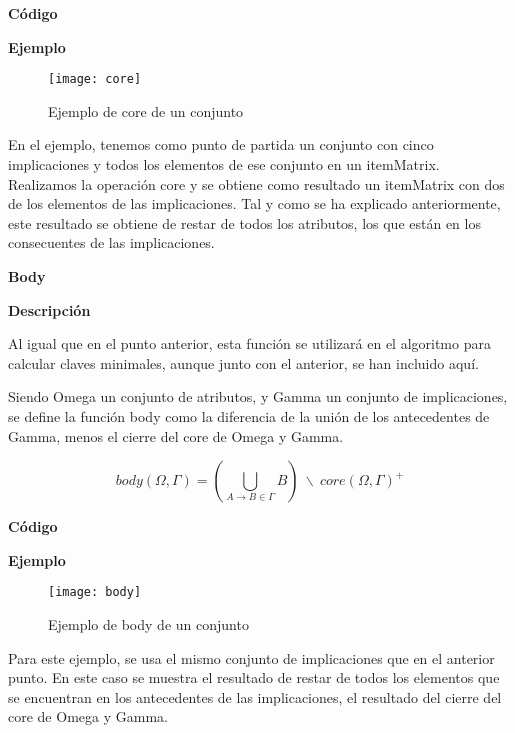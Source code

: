     \bigskip


    \textbf{C\'odigo}

    
    \clearpage

    \textbf{Ejemplo}


    \begin{figure}[H]
        \centering
        \texttt{[image: core]}
        \caption{Ejemplo de core de un conjunto}
        \label{fig:core}
    \end{figure}

    En el ejemplo, tenemos como punto de partida un conjunto con cinco implicaciones y todos los elementos de ese conjunto en 
    un itemMatrix. Realizamos la operaci\'on core y se obtiene como resultado un itemMatrix con dos de los elementos de las implicaciones. 
    Tal y como se ha explicado anteriormente, este resultado se obtiene de restar de todos los atributos, los que est\'an en los consecuentes 
    de las implicaciones.
    \\

    \bigskip

\textbf{ \large Body}

\smallskip

    \textbf{Descripci\'on}

    Al igual que en el punto anterior, esta funci\'on se utilizar\'a en el algoritmo para calcular claves minimales, aunque junto con 
    el anterior, se han incluido aqu\'i.

    Siendo Omega un conjunto de atributos, y Gamma un conjunto de implicaciones, se define la funci\'on body como la diferencia 
    de la uni\'on de los antecedentes de Gamma, menos el cierre del core de Omega y Gamma. 

    \[
        body(\Omega , \Gamma ) = ( \bigcup_{A \to B \in \Gamma} B ) ~ \backslash ~ core(\Omega , \Gamma )^+
    \]

    \textbf{C\'odigo}

    
    \bigskip

    \textbf{Ejemplo}


    \begin{figure}[H]
        \centering
        \texttt{[image: body]}
        \caption{Ejemplo de body de un conjunto}
        \label{fig:body}
    \end{figure}

    Para este ejemplo, se usa el mismo conjunto de implicaciones que en el anterior punto. En este caso se muestra el 
    resultado de restar de todos los elementos que se encuentran en los antecedentes de las implicaciones, 
    el resultado del cierre del core de Omega y Gamma.

    \newpage
    \thispagestyle{empty}
    \mbox{}
    \newpage